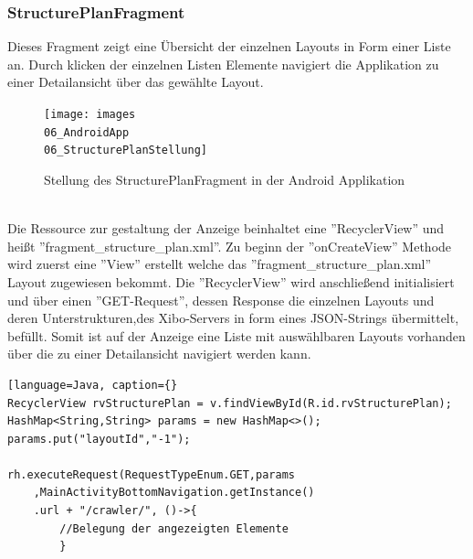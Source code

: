 \subsubsection{StructurePlanFragment}
Dieses Fragment zeigt eine Übersicht der einzelnen Layouts in Form einer Liste an. Durch klicken der einzelnen Listen Elemente navigiert die Applikation zu einer Detailansicht über das gewählte Layout.
\\
\begin{figure}[H]
\centering
\texttt{[image: images\\06\_AndroidApp\\06\_StructurePlanStellung]}
\caption{Stellung des StructurePlanFragment in der Android Applikation}
\label{fig:mediaNav}
\end{figure}
\\	
Die Ressource zur gestaltung der Anzeige beinhaltet eine ''RecyclerView'' und heißt ''fragment\_structure\_plan.xml''. Zu beginn der ''onCreateView'' Methode wird zuerst eine ''View'' erstellt welche das ''fragment\_structure\_plan.xml'' Layout zugewiesen bekommt. Die ''RecyclerView'' wird anschließend initialisiert und über einen ''GET-Request'', dessen Response die einzelnen Layouts und deren Unterstrukturen,des Xibo-Servers in form eines JSON-Strings übermittelt, befüllt. Somit ist auf der Anzeige eine Liste mit auswählbaren Layouts vorhanden über die zu einer Detailansicht navigiert werden kann. 
\begin{lstlisting}[language=Java, caption={}
RecyclerView rvStructurePlan = v.findViewById(R.id.rvStructurePlan);
HashMap<String,String> params = new HashMap<>();
params.put("layoutId","-1");
    
rh.executeRequest(RequestTypeEnum.GET,params
	,MainActivityBottomNavigation.getInstance()
	.url + "/crawler/", ()->{
		//Belegung der angezeigten Elemente
		}
\end{lstlisting}

